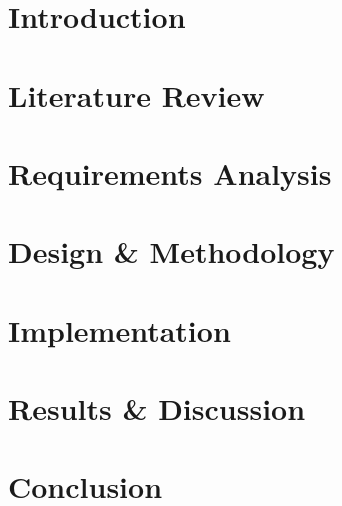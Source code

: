 \documentclass[harvard]{lincolncsthesis}
\begin{document}
\maketitle





\thesisTables
\thesisBodyStart

\chapter{Introduction}


\chapter{Literature Review}


\chapter{Requirements Analysis}


\chapter{Design \& Methodology}


\chapter{Implementation}


\chapter{Results \& Discussion}


\chapter{Conclusion}


\printReferences
\end{document}
